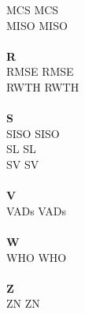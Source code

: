 \begin{tabbing}
\acs{MCS}       \> \acl{MCS} \\
\acs{MISO}       \> \acl{MISO}\\
\\
\textbf{R}\\
\acs{RMSE}       \> \acl{RMSE}\\
\acs{RWTH}       \> \acl{RWTH}\\
\\
\textbf{S}\\
\acs{SISO}       \> \acl{SISO}\\
\acs{SL}       \> \acl{SL}\\
\acs{SV}       \> \acl{SV} \\
\\
\textbf{V}\\
\acs{VADs}       \> \acl{VADs} \\
\\
\textbf{W}\\
\acs{WHO}       \> \acl{WHO} \\
\\
\textbf{Z}\\
\acs{ZN}       \> \acl{ZN} \\
\end{tabbing}
%
%
%
%
%
%
%
%
